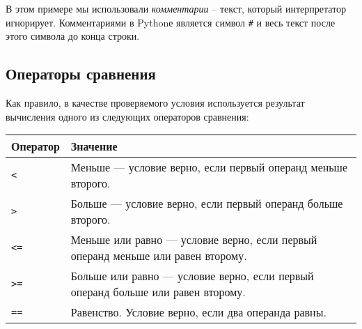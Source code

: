 В этом примере мы использовали \emph{комментарии} -- текст, который
интерпретатор игнорирует. Комментариями в Pythonе является символ
\texttt{\#} и весь текст после этого символа до конца строки.

\subsection{Операторы
сравнения}\label{ux43eux43fux435ux440ux430ux442ux43eux440ux44b-ux441ux440ux430ux432ux43dux435ux43dux438ux44f}

Как правило, в качестве проверяемого условия используется результат
вычисления одного из следующих операторов сравнения:

\begin{longtable}[c]{@{}ll@{}}
\toprule
\begin{minipage}[b]{0.11\columnwidth}\raggedright\strut
Оператор
\strut\end{minipage} &
\begin{minipage}[b]{0.83\columnwidth}\raggedright\strut
Значение
\strut\end{minipage}\tabularnewline
\midrule
\endhead
\begin{minipage}[t]{0.11\columnwidth}\raggedright\strut
\texttt{\textless{}}
\strut\end{minipage} &
\begin{minipage}[t]{0.83\columnwidth}\raggedright\strut
Меньше --- условие верно, если первый операнд меньше второго.
\strut\end{minipage}\tabularnewline
\begin{minipage}[t]{0.11\columnwidth}\raggedright\strut
\texttt{\textgreater{}}
\strut\end{minipage} &
\begin{minipage}[t]{0.83\columnwidth}\raggedright\strut
Больше --- условие верно, если первый операнд больше второго.
\strut\end{minipage}\tabularnewline
\begin{minipage}[t]{0.11\columnwidth}\raggedright\strut
\texttt{\textless{}=}
\strut\end{minipage} &
\begin{minipage}[t]{0.83\columnwidth}\raggedright\strut
Меньше или равно --- условие верно, если первый операнд меньше или равен
второму.
\strut\end{minipage}\tabularnewline
\begin{minipage}[t]{0.11\columnwidth}\raggedright\strut
\texttt{\textgreater{}=}
\strut\end{minipage} &
\begin{minipage}[t]{0.83\columnwidth}\raggedright\strut
Больше или равно --- условие верно, если первый операнд больше или равен
второму.
\strut\end{minipage}\tabularnewline
\begin{minipage}[t]{0.11\columnwidth}\raggedright\strut
\texttt{==}
\strut\end{minipage} &
\begin{minipage}[t]{0.83\columnwidth}\raggedright\strut
Равенство. Условие верно, если два операнда равны.
\strut\end{minipage}\tabularnewline
\bottomrule
\end{longtable}

